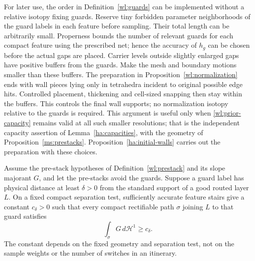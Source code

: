 For later use, the order in Definition~\ref{wl:guards} can be
implemented without a relative isotopy fixing guards.  Reserve tiny
forbidden parameter neighborhoods of the guard labels in each
feature before sampling.  Their total length can be arbitrarily
small.  Properness bounds the number of relevant guards for each
compact feature using the prescribed net; hence the accuracy of
$h_g$ can be chosen before the actual gaps are placed.  Carrier
levels outside slightly enlarged gaps have positive buffers from the
guards.  Make the mesh and boundary motions smaller than these
buffers.  The preparation in Proposition~\ref{wl:normalization} ends with
wall pieces lying only in tetrahedra incident to original possible
edge hits.
Controlled placement, thickening and cell-sized snapping then stay
within the buffers.  This controls the final wall supports; no
normalization isotopy relative to the guards is required.
This argument is useful only when
\eqref{wl:prior-capacity} remains valid at all such smaller
resolutions; that is the independent capacity assertion of
Lemma~\ref{ha:capacities}, with the geometry of
Proposition~\ref{ms:prestacks}.  Proposition~\ref{ha:initial-walls}
carries out the preparation with these choices.

\begin{lemma}\label{wl:crossing-bound}
Assume the pre-stack hypotheses of Definition~\ref{wl:prestack} and
its slope majorant $G$, and let the pre-stacks avoid the guards.
Suppose a guard label has physical distance at least $\delta>0$ from
the standard support of a good routed layer $L$.  On a fixed compact
separation test, sufficiently accurate feature stairs give a
constant $c_\delta>0$ such that every compact rectifiable path $\sigma$
joining $L$ to that guard satisfies
\begin{equation}\label{wl:path-cost}
 \int_\sigma G\,d\mathcal H^1\geq c_\delta.
\end{equation}
The constant depends on the fixed geometry and separation test, not
on the sample weights or the number of switches in an itinerary.
\end{lemma}

